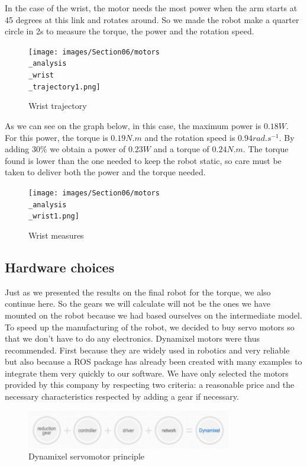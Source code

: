 In the case of the wrist, the motor needs the most power when the arm starts at 45 degrees at this link and rotates around. So we made the robot make a quarter circle in 2s to measure the torque, the power and the rotation speed.

\begin{figure}[ht]
    \centering
    \texttt{[image: images/Section06/motors\\\_analysis\\\_wrist\\\_trajectory1.png]}
    \caption{Wrist trajectory}
    \label{fig:mesh15}
\end{figure}
\FloatBarrier

As we can see on the graph below, in this case, the maximum power is $0.18W$. For this power, the torque is $0.19N.m$ and the rotation speed is $0.94rad.s^{-1}$. By adding 30\% we obtain a power of $0.23W$ and a torque of $0.24N.m$. The torque found is lower than the one needed to keep the robot static, so care must be taken to deliver both the power and the torque needed.
\begin{figure}[ht]
    \centering
    \texttt{[image: images/Section06/motors\\\_analysis\\\_wrist1.png]}
    \caption{Wrist measures}
    \label{fig:mesh15}
\end{figure}
\FloatBarrier

\subsection{Hardware choices}

Just as we presented the results on the final robot for the torque, we also continue here. So the gears we will calculate will not be the ones we have mounted on the robot because we had based ourselves on the intermediate model. To speed up the manufacturing of the robot, we decided to buy servo motors so that we don't have to do any electronics. Dynamixel motors were thus recommended. First because they are widely used in robotics and very reliable but also because a ROS package has already been created with many examples to integrate them very quickly to our software. We have only selected the motors provided by this company by respecting two criteria: a reasonable price and the necessary characteristics respected by adding a gear if necessary.

\begin{figure}[ht]
    \centering
    \includegraphics[width=0.8\textwidth]{images/Section06/dynamixel.png}
    \caption{Dynamixel servomotor principle}
    \label{fig:mesh15}
\end{figure}
\FloatBarrier

